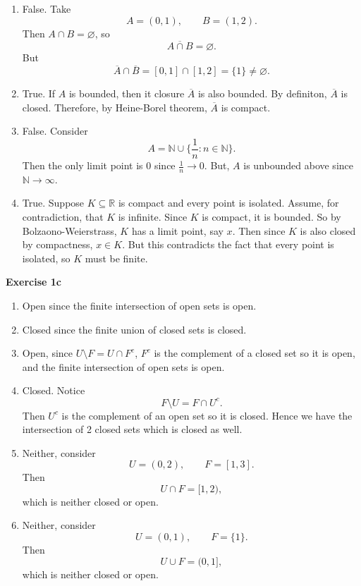 \documentclass[12pt]{article}
\begin{document}
\begin{enumerate}[label=(\roman*)]
    \item False. Take
          \[
              A = (0,1), \qquad B = (1,2).
          \]
          Then \( A \cap B  = \varnothing \), so
          \[
              \overline{A \cap B} = \varnothing .
          \]
          But
          \[
              \overline{A} \cap \overline{B} = [0,1] \cap [1,2] = \{1\} \neq \varnothing .
          \]


    \item True. If \( A \) is bounded, then it closure \( \overline{A} \) is also bounded. By definiton, \( \overline{A} \) is closed. Therefore, by Heine-Borel theorem, \( \overline{A} \) is compact.
    \item False. Consider
          \[
              A  = \mathbb{N} \cup  \{\frac{1}{n}: n \in \mathbb{N}\}.
          \]
          Then the only limit point is 0 since \( \frac{1}{n} \to 0 \).
          But, \( A \) is unbounded above since \( \mathbb{N} \to \infty  \).

    \item True. Suppose \( K \subseteq \mathbb{R} \) is compact and every point is isolated. Assume, for contradiction, that \( K \) is infinite. Since \( K \) is compact, it is bounded. So by Bolzaono-Weierstrass, \( K \) has a limit point, say \( x \). Then since \( K \) is also closed by compactness, \( x \in K \). But this contradicts the fact that every point is isolated, so \( K  \) must be finite.
\end{enumerate}

\textbf{Exercise 1c}
\begin{enumerate}[label=(\roman*)]
    \item Open since the finite intersection of open sets is open.
    \item Closed since the finite union of closed sets is closed.
    \item Open, since \( U \setminus F = U \cap F^c \), \( F^c \) is the complement of a closed set so it is open, and the finite intersection of open sets is open.
    \item Closed. Notice
          \[
              F \setminus U = F \cap U^c.
          \]
          Then \( U^c \) is the complement of an open set so it is closed. Hence we have the intersection of 2 closed sets which is closed as well.\
    \item Neither, consider
          \[
              U = (0,2), \qquad F = [1,3].
          \]
          Then
          \[
              U \cap F = [1,2),
          \]
          which is neither closed or open.

    \item Neither, consider
          \[
              U = (0,1), \qquad F = \{1\}.
          \]
          Then
          \[
              U \cup F = (0, 1],
          \]
          which is neither closed or open.
\end{enumerate}
\end{document}
